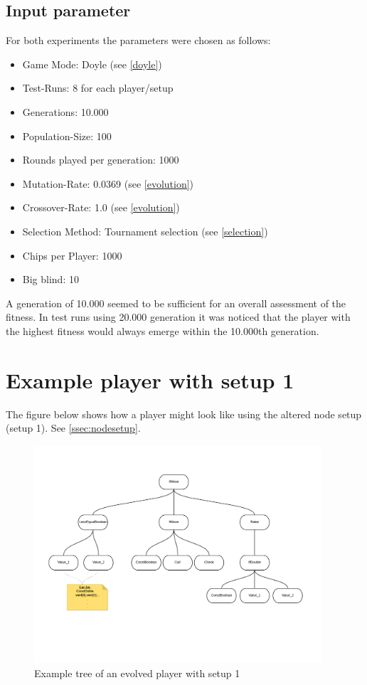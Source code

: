 \documentclass[12pt,fleqn,a4paper]{article}
\begin{document}
\subsection{Input parameter}
\label{inputparameter}
For both experiments the parameters were chosen as follows: 
\begin{itemize}
	\item Game Mode: Doyle (see \ref{doyle})
	\item Test-Runs: 8 for each player/setup
	\item Generations: 10.000
	\item Population-Size: 100
	\item Rounds played per generation: 1000
	\item Mutation-Rate: 0.0369 (see \ref{evolution})
	\item Crossover-Rate: 1.0 (see \ref{evolution})
	\item Selection Method: Tournament selection (see \ref{selection})
	\item Chips per Player: 1000 
	\item Big blind: 10
\end{itemize} 
A generation of 10.000 seemed to be sufficient for an overall assessment of the fitness. In test runs using 20.000 generation it was noticed that
the player with the highest fitness would always emerge within the 10.000th generation.

\section{Example player with setup 1}
The figure below shows how a player might look like using the altered node setup (setup 1). See \ref{ssec:nodesetup}.
\begin{figure}[!ht]
	\begin{center}
		\includegraphics[width=0.95\textwidth]{NewRaise.png}
		\caption{Example tree of an evolved player with setup 1}
		\end{center}
		\end{figure}
\end{document}
